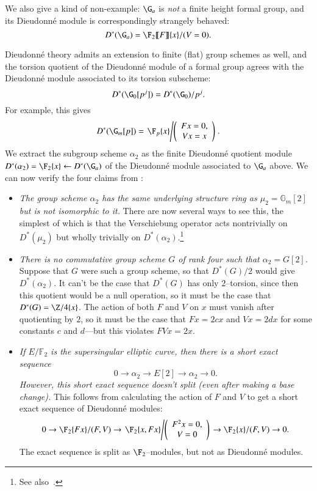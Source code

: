 \begin{example}
We also give a kind of non-example: $\G_a$ is \emph{not} a finite height formal group, and its Dieudonn\'e module is correspondingly strangely behaved: \[D^*(\G_a) = \F_2\ps{F}\{x\} / (V = 0).\]
\end{example}

\begin{example}\label{WorkedAlpha2Example}
Dieudonn\'e theory admits an extension to finite (flat) group schemes as well, and the torsion quotient of the Dieudonn\'e module of a formal group agrees with the Dieudonn\'e module associated to its torsion subscheme: \[D^*(\G_0[p^j]) = D^*(\G_0) / p^j.\]  For example, this gives \[D^*(\G_m[p]) = \left.\F_p\{x\} \middle/\left(\begin{array}{c} Fx = 0, \\ Vx = x \end{array}\right)\right. .\]  We extract the subgroup scheme $\alpha_2$ as the finite Dieudonn\'e quotient module $D^*(\alpha_2) = \F_2\{x\} \leftarrow D^*(\G_a)$ of the Dieudonn\'e module associated to $\G_a$ above.  We can now verify the four claims from :
\begin{itemize}
\item \textit{The group scheme $\alpha_2$ has the same underlying structure ring as $\mu_2 = \mathbb{G}_m[2]$ but is not isomorphic to it.}  There are now several ways to see this, the simplest of which is that the Verschiebung operator acts nontrivially on $D^*(\mu_2)$ but wholly trivially on $D^*(\alpha_2)$.\footnote{See also~\cite[Example 8.5]{StricklandFPFP}.}
\item \textit{There is no commutative group scheme $G$ of rank four such that $\alpha_2 = G[2]$.}  Suppose that $G$ were such a group scheme, so that $D^*(G) / 2$ would give $D^*(\alpha_2)$.  It can't be the case that $D^*(G)$ has only $2$--torsion, since then this quotient would be a null operation, so it must be the case that $D^*(G) = \Z/4\{x\}$.  The action of both $F$ and $V$ on $x$ must vanish after quotienting by $2$, so it must be the case that $Fx = 2cx$ and $Vx = 2dx$ for some constants $c$ and $d$---but this violates $FVx = 2x$.
\item \textit{If $E/\mathbb{F}_2$ is the supersingular elliptic curve, then there is a short exact sequence \[0 \rightarrow \alpha_2 \rightarrow E[2] \rightarrow \alpha_2 \rightarrow 0.\]  However, this short exact sequence doesn't split (even after making a base change).}  This follows from calculating the action of $F$ and $V$ to get a short exact sequence of Dieudonn\'e modules: \[0 \to \F_2\{Fx\}/(F, V) \to \left.\F_2\{x, Fx\} \middle/ \left( \begin{array}{c} F^2x = 0, \\ V = 0 \end{array}\right) \right. \to \F_2\{x\}/(F, V) \to 0.\]  The exact sequence is split as $\F_2$--modules, but not as Dieudonn\'e modules.

\end{itemize}
\end{example}
